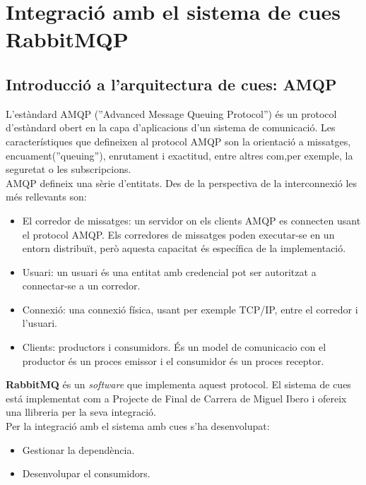 \section{Integraci\'{o} amb el sistema de cues RabbitMQP}
\subsection{Introducci\'{o} a l'arquitectura de cues: AMQP}
\label{sec:queue_system_overview}
L'est\`{a}ndard AMQP (''Advanced Message Queuing Protocol'') \'{e}s un protocol d'est\`{a}ndard obert en la capa d'aplicacions d'un sistema de comunicació. Les característiques que defineixen al protocol AMQP son la orientació a missatges, encuament(''queuing''), enrutament i exactitud, entre altres com,per exemple, la seguretat o les subscripcions.\cite{amqp}\\

AMQP defineix una s\`{e}rie d'entitats. Des de la perspectiva de la interconnexió les m\'{e}s rellevants son:
\begin{itemize}
\item El corredor de missatges: un servidor on els clients AMQP es connecten usant el protocol AMQP. Els corredores de missatges poden executar-se en un entorn distribuït, però aquesta capacitat \'{e}s espec\'{i}fica de la implementació.
\item Usuari: un usuari \'{e}s una entitat amb credencial pot ser autoritzat a connectar-se a un corredor.
\item Connexió: una connexi\'{o} f\'{i}sica, usant per exemple TCP/IP, entre el corredor i l'usuari.
\item Clients: productors i consumidors. \'{E}s un model de comunicacio con el productor \'{e}s un proces emissor  i el consumidor \'{e}s un proces receptor.\cite{messaging}
\end{itemize}

\textbf{RabbitMQ} \'{e}s un \textit{software} que implementa aquest protocol. El sistema de cues est\'{a} implementat com a Projecte de Final de Carrera de Miguel Ibero i ofereix una llibreria per la seva integració.\\

Per la integració amb el sistema amb cues s'ha desenvolupat:
\begin{itemize}
\item Gestionar la dependència.
\item Desenvolupar el consumidors.
\end{itemize}

